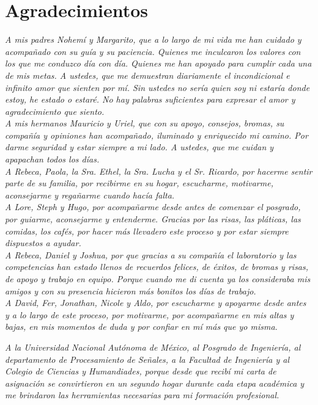 \chapter*{Agradecimientos}

\textit{A mis padres Nohemí y Margarito, que a lo largo de mi vida me han cuidado y acompañado con su guía y su paciencia. Quienes me inculcaron los valores con los que me conduzco día con día. Quienes me han apoyado para cumplir cada una de mis metas. A ustedes, que me demuestran diariamente el incondicional e infinito amor que sienten por mí. Sin ustedes no sería quien soy ni estaría donde estoy, he estado o estaré. No hay palabras suficientes para expresar el amor y agradecimiento que siento.}\\

\textit{A mis hermanos Mauricio y Uriel, que con su apoyo, consejos, bromas, su compañía y opiniones han acompañado, iluminado y enriquecido mi camino. Por darme seguridad y estar siempre a mi lado. A ustedes, que me cuidan y apapachan todos los días.}\\

\textit{A Rebeca, Paola, la Sra. Ethel, la Sra. Lucha y el Sr. Ricardo, por hacerme sentir parte de su familia, por recibirme en su hogar, escucharme, motivarme, aconsejarme y regañarme cuando hacía falta.}\\

\textit{A Lore, Steph y Hugo, por acompañarme desde antes de comenzar el posgrado, por guiarme, aconsejarme y entenderme. Gracias por las risas, las pláticas, las comidas, los cafés, por hacer más llevadero este proceso y por estar siempre dispuestos a ayudar.}\\

\textit{A Rebeca, Daniel y Joshua, por que gracias a su compañía el laboratorio y las competencias han estado llenos de recuerdos felices, de éxitos, de bromas y risas, de apoyo y trabajo en equipo. Porque cuando me di cuenta ya los consideraba mis amigos y con su presencia hicieron más bonitos los días de trabajo.}\\

\textit{A David, Fer, Jonathan, Nicole y Aldo, por escucharme y apoyarme desde antes y a lo largo de este proceso, por motivarme, por acompañarme en mis altas y bajas, en mis momentos de duda y por confiar en mí más que yo misma.}\\


\newpage

\textit{A la Universidad Nacional Autónoma de México, al Posgrado de Ingeniería, al departamento de Procesamiento de Señales, a la Facultad de Ingeniería y al Colegio de Ciencias y Humandiades, porque desde que recibí mi carta de asignación se convirtieron en un segundo hogar durante cada etapa académica y me brindaron las herramientas necesarias para mi formación profesional.}\\

